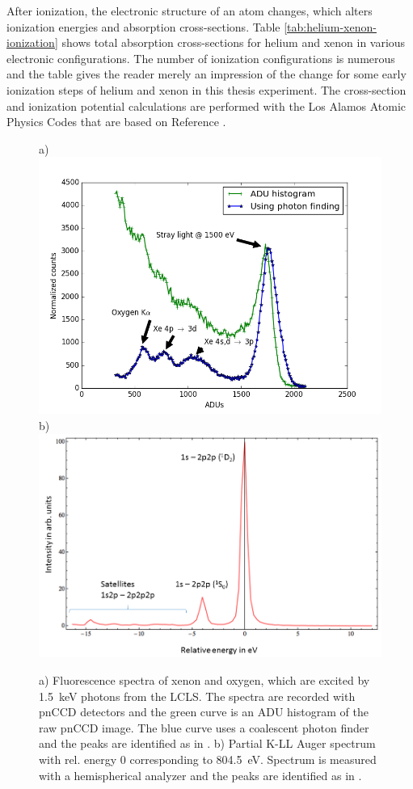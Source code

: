 After ionization, the electronic structure of an atom changes, which alters ionization energies and absorption cross-sections. Table \ref{tab:helium-xenon-ionization} shows total absorption cross-sections for helium and xenon in various electronic configurations. The number of ionization configurations is numerous and the table gives the reader merely an impression of the change for some early ionization steps of helium and xenon in this thesis experiment. The cross-section and ionization potential calculations are performed with the Los Alamos Atomic Physics Codes \cite{los-alamos-2016} that are based on Reference \citep{Cowan-1981-Cal}.\\[1\baselineskip]
%
%
%
\begin{figure}
	\centering
		a)\includegraphics[width=.47\textwidth]{images/pnCCD-histogram.png}
		b)\includegraphics[width=.47\textwidth]{images/auger-spectra.png}
	\caption[Fluorescence peaks from xenon and neon K-LL Auger spectrum.]{a) Fluorescence spectra of xenon and oxygen, which are excited by \SI{1.5}{\kilo\electronvolt} photons from the LCLS. The spectra are recorded with pnCCD detectors \citep{Bucher-2016-Unpublished} and the green curve is an ADU histogram of the raw pnCCD image. The blue curve uses a coalescent photon finder \cite{Foucar-2016-JAC} and the peaks are identified as in \cite{Rudek-2012-NatPho}. b) Partial K-LL Auger spectrum with rel. energy 0 corresponding to \SI{804.5}{\electronvolt}. Spectrum is measured with a hemispherical analyzer \citep{Bucher-2014-Unpublished} and the peaks are identified as in \citep{Krause-1970-PhysLettA}.}
	\label{fig:pnCCD-histogram}
\end{figure}
